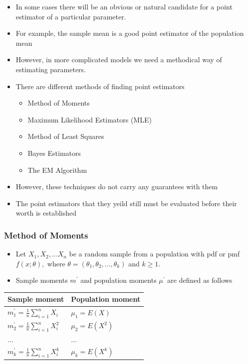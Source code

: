 \documentclass[]{book}
\providecommand{\tightlist}{%
  \setlength{\itemsep}{0pt}\setlength{\parskip}{0pt}}
\begin{document}
\begin{itemize}
\tightlist
\item
  In some cases there will be an obvious or natural candidate for a point estimator of a particular parameter.
\item
  For example, the sample mean is a good point estimator of the population mean
\item
  However, in more complicated models we need a methodical way of estimating parameters.
\item
  There are different methods of finding point estimators

  \begin{itemize}
  \tightlist
  \item
    Method of Moments
  \item
    Maximum Likelihood Estimators (MLE)
  \item
    Method of Least Squares 
  \item
    Bayes Estimators
  \item
    The EM Algorithm
  \end{itemize}
\item
  However, these techniques do not carry any guarantees with them
\item
  The point estimators that they yeild still must be evaluated before their worth is established
\end{itemize}

\hypertarget{method-of-moments}{%
\subsubsection{Method of Moments}\label{method-of-moments}}

\begin{itemize}
\tightlist
\item
  Let \(X_1, X_2, \dots X_n\) be a random sample from a population with pdf or pmf \(f(x; \theta),\) where \(\theta = (\theta_1, \theta_2, \dots, \theta_k)\) and \(k\geq 1\).
\item
  Sample moments \(m^\prime\) and population moments \(\mu^\prime\) are defined as follows
\end{itemize}

\begin{longtable}[]{@{}ll@{}}
\toprule
Sample moment & Population moment\tabularnewline
\midrule
\endhead
\(m_1^\prime= \frac{1}{n}\sum_{i=1}^nX_i\) & \(\mu_1=E(X)\)\tabularnewline
\(m_2^\prime= \frac{1}{n}\sum_{i=1}^nX_i^2\) & \(\mu_2=E(X^2)\)\tabularnewline
\(\dots\) & \(\dots\)\tabularnewline
\(m_k^\prime= \frac{1}{n}\sum_{i=1}^nX_i^k\) & \(\mu_k=E(X^k)\)\tabularnewline
\bottomrule
\end{longtable}
\end{document}
